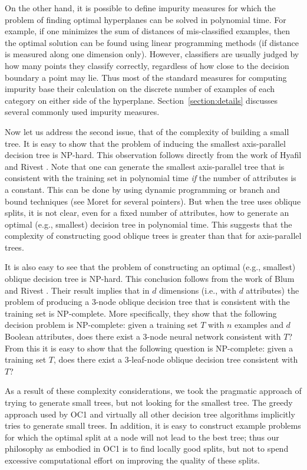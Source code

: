 On the other hand, it is possible to define impurity measures for
which the problem of finding optimal hyperplanes can be solved in
polynomial time.  For example, if one minimizes the sum of distances
of mis-classified examples, then the optimal solution can be found
using linear programming methods (if distance is measured along one
dimension only).  However, classifiers are usually judged by how many
points they classify correctly, regardless of how close to the
decision boundary a point may lie.  Thus most of the standard measures
for computing impurity base their calculation on the discrete number
of examples of each category on either side of the hyperplane.
Section~\ref{section:details} discusses several commonly used impurity
measures.

Now let us address the second issue, that of the complexity of
building a small tree.  It is easy to show that the problem of
inducing the smallest axis-parallel decision tree is NP-hard.  This
observation follows directly from the work of Hyafil and Rivest
\citeyear{hyafil/rivest/76}.  Note that one can generate the smallest
axis-parallel tree that is consistent with the training set in
polynomial time {\it if} the number of attributes is a constant.  This
can be done by using dynamic programming or branch and bound
techniques (see Moret \citeyear{moret/82} for several pointers).  But
when the tree uses oblique splits, it is not clear, even for a fixed
number of attributes, how to generate an optimal (e.g., smallest)
decision tree in polynomial time.  This suggests that the complexity
of constructing good oblique trees is greater than that for
axis-parallel trees.

It is also easy to see that the problem of constructing an optimal
(e.g., smallest) oblique decision tree is NP-hard.  This conclusion
follows from the work of Blum and Rivest \citeyear{blum/rivest/88}.
Their result implies that in $d$ dimensions (i.e., with $d$
attributes) the problem of producing a 3-node oblique decision tree
that is consistent with the training set is NP-complete.  More
specifically, they show that the following decision problem is
NP-complete: given a training set $T$ with $n$ examples and $d$
Boolean attributes, does there exist a 3-node neural network
consistent with $T$?  From this it is easy to show that the following
question is NP-complete: given a training set $T$, does there exist a
3-leaf-node oblique decision tree consistent with $T$?

As a result of these complexity considerations, we took the pragmatic
approach of trying to generate small trees, but not looking for the
smallest tree.  The greedy approach used by OC1 and virtually all
other decision tree algorithms implicitly tries to generate small
trees.  In addition, it is easy to construct example problems for
which the optimal split at a node will not lead to the best tree; thus
our philosophy as embodied in OC1 is to find locally good splits, but
not to spend excessive computational effort on improving the quality
of these splits.

